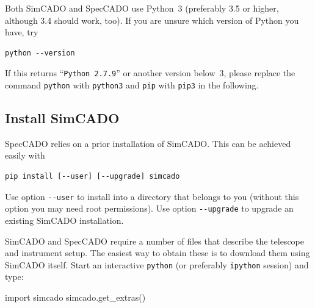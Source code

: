 \documentclass[a4paper,twoside,11pt]{article}
\begin{document}
Both SimCADO and SpecCADO use Python~3 (preferably 3.5 or higher,
although 3.4 should work, too). If you are unsure which version of
Python you have, try
\begin{lstlisting}[style=csh]
python --version
\end{lstlisting}
If this returns ``\lstinline{Python 2.7.9}'' or another version
below~3, please replace the command \lstinline{python} with
\lstinline{python3} and \lstinline{pip} with \lstinline{pip3} in the
following.

\subsection{Install SimCADO}
\label{ssec:install_simcado}

SpecCADO relies on a prior installation of SimCADO. This can be
achieved easily with
\begin{lstlisting}[style=csh]
pip install [--user] [--upgrade] simcado
\end{lstlisting}
Use option \lstinline{--user} to install into a directory that belongs
to you (without this option you may need root permissions). Use
option \lstinline{--upgrade} to upgrade an existing SimCADO installation.

SimCADO and SpecCADO require a number of files that describe the
telescope and instrument setup. The easiest way to obtain these is to
download them using SimCADO itself. Start an interactive
\lstinline{python} (or preferably \lstinline{ipython} session) and
type:
\begin{pyin}
import simcado
simcado.get_extras()
\end{pyin}


\end{document}
